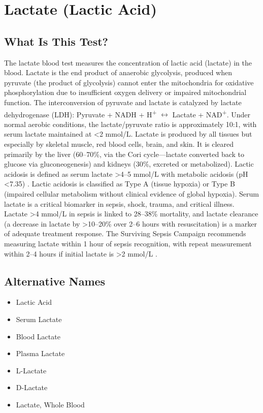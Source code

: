 \chapter{Lactate (Lactic Acid)}

\section*{What Is This Test?}
The lactate blood test measures the concentration of lactic acid (lactate) in the blood. Lactate is the end product of anaerobic glycolysis, produced when pyruvate (the product of glycolysis) cannot enter the mitochondria for oxidative phosphorylation due to insufficient oxygen delivery or impaired mitochondrial function. The interconversion of pyruvate and lactate is catalyzed by lactate dehydrogenase (LDH): Pyruvate + NADH + H\textsuperscript{+} $\leftrightarrow$ Lactate + NAD\textsuperscript{+}. Under normal aerobic conditions, the lactate/pyruvate ratio is approximately 10:1, with serum lactate maintained at <2 mmol/L. Lactate is produced by all tissues but especially by skeletal muscle, red blood cells, brain, and skin. It is cleared primarily by the liver (60--70\%, via the Cori cycle---lactate converted back to glucose via gluconeogenesis) and kidneys (30\%, excreted or metabolized). Lactic acidosis is defined as serum lactate >4--5 mmol/L with metabolic acidosis (pH <7.35) \cite{kraut2014lactic}. Lactic acidosis is classified as Type A (tissue hypoxia) or Type B (impaired cellular metabolism without clinical evidence of global hypoxia). Serum lactate is a critical biomarker in sepsis, shock, trauma, and critical illness. Lactate >4 mmol/L in sepsis is linked to 28--38\% mortality, and lactate clearance (a decrease in lactate by >10--20\% over 2--6 hours with resuscitation) is a marker of adequate treatment response. The Surviving Sepsis Campaign recommends measuring lactate within 1 hour of sepsis recognition, with repeat measurement within 2--4 hours if initial lactate is >2 mmol/L \cite{evans2021surviving,tietz2023textbook}.

\section*{Alternative Names}
\begin{itemize}
  \item Lactic Acid
  \item Serum Lactate
  \item Blood Lactate
  \item Plasma Lactate
  \item L-Lactate
  \item D-Lactate
  \item Lactate, Whole Blood
\end{itemize}
